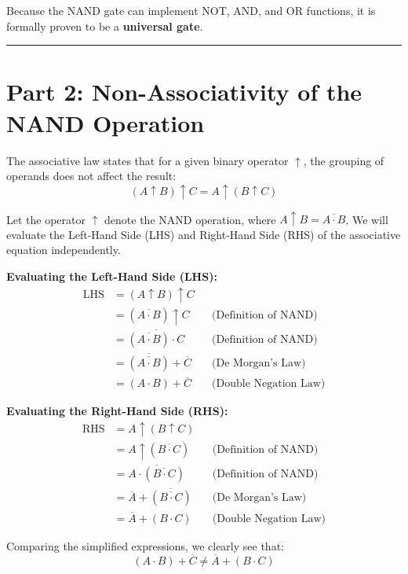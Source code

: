 \documentclass[12pt,a3paper]{article}
\begin{document}
\begin{enumerate}
\begin{tcolorbox}[enhanced,breakable,ansbox,colback=cA!4,colframe=cA,boxrule=0.8pt,arc=5pt,title={\textbf{Answer}},fonttitle=\bfseries\color{white},colbacktitle=cA]
Because the NAND gate can implement NOT, AND, and OR functions, it is formally proven to be a \textbf{universal gate}.

\vspace{0.5cm}
\hrule
\vspace{0.5cm}

\section*{Part 2: Non-Associativity of the NAND Operation}

The associative law states that for a given binary operator $\uparrow$, the grouping of operands does not affect the result:
$$ (A \uparrow B) \uparrow C = A \uparrow (B \uparrow C) $$

Let the operator $\uparrow$ denote the NAND operation, where $A \uparrow B = \overline{A \cdot B}$. We will evaluate the Left-Hand Side (LHS) and Right-Hand Side (RHS) of the associative equation independently.

\textbf{Evaluating the Left-Hand Side (LHS):}
\begin{align*}
\text{LHS} &= (A \uparrow B) \uparrow C \\
&= (\overline{A \cdot B}) \uparrow C && \text{(Definition of NAND)} \\
&= \overline{(\overline{A \cdot B}) \cdot C} && \text{(Definition of NAND)} \\
&= \overline{(\overline{A \cdot B})} + \overline{C} && \text{(De Morgan's Law)} \\
&= (A \cdot B) + \overline{C} && \text{(Double Negation Law)}
\end{align*}

\textbf{Evaluating the Right-Hand Side (RHS):}
\begin{align*}
\text{RHS} &= A \uparrow (B \uparrow C) \\
&= A \uparrow (\overline{B \cdot C}) && \text{(Definition of NAND)} \\
&= \overline{A \cdot (\overline{B \cdot C})} && \text{(Definition of NAND)} \\
&= \overline{A} + \overline{(\overline{B \cdot C})} && \text{(De Morgan's Law)} \\
&= \overline{A} + (B \cdot C) && \text{(Double Negation Law)}
\end{align*}

Comparing the simplified expressions, we clearly see that:
$$ (A \cdot B) + \overline{C} \neq \overline{A} + (B \cdot C) $$


\end{tcolorbox}
\end{enumerate}
\end{document}
